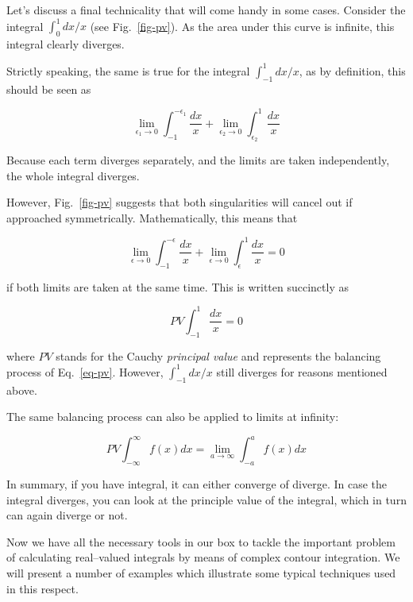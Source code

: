 Let's discuss a final technicality that will come handy in some cases. Consider the integral $\int_0^1 dx / x$ (see Fig.~\ref{fig-pv}). As the area under this curve is infinite, this integral clearly diverges.

Strictly speaking, the same is true for the integral $\int_{-1}^1 dx / x$, as by definition, this should be seen as

\begin{equation}
\lim_{\epsilon_1 \to 0} \int_{-1}^{-\epsilon_1} \frac{dx}{x} + \lim_{\epsilon_2
\to 0} \int_{\epsilon_2}^1 \frac{dx}{x}
\end{equation}  

Because each term diverges separately, and the limits are taken independently, the whole integral diverges. 

However, Fig.~\ref{fig-pv} suggests that both singularities will cancel out if approached symmetrically. Mathematically, this means that

\begin{equation}
\lim_{\epsilon \to 0} \int_{-1}^{-\epsilon} \frac{dx}{x} + \lim_{\epsilon \to 0}
\int_{\epsilon}^1 \frac{dx}{x} = 0 \label{eq-pv}
\end{equation}  

if both limits are taken at the same time. This is written succinctly as

\begin{equation}
PV \int_{-1}^1 \frac{dx}{x} = 0
\end{equation} 

where $PV$ stands for the Cauchy \emph{principal value} and represents the balancing process of Eq.~\ref{eq-pv}. However, $\int_{-1}^1 dx / x$ still diverges for reasons mentioned above.

The same balancing process can also be applied to limits at infinity:

\begin{equation}
PV \int_{-\infty}^\infty f(x) dx = \lim_{a \to \infty} \int_{-a}^{a} f(x) dx
\end{equation} 

In summary, if you have integral, it can either converge of diverge. In case the integral diverges, you can look at the principle value of the integral, which in turn can again diverge or not.

\pagebreak


Now we have all the necessary tools in our box to tackle the important problem
of calculating real--valued integrals by means of complex contour integration.
We will present a number of examples which illustrate some typical techniques
used in this respect.

